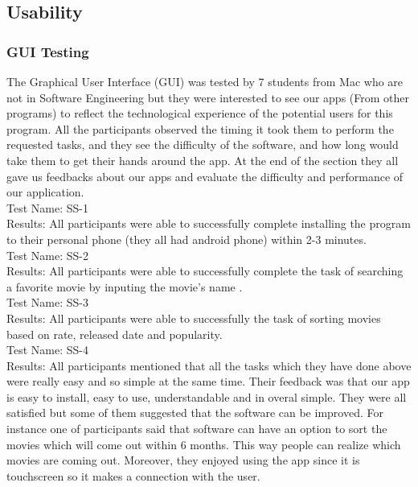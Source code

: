 \documentclass[12pt, titlepage]{article}
\begin{document}
\subsection{Usability}
\subsubsection{GUI Testing}
The Graphical User Interface (GUI) was tested by 7 students from Mac who are not in Software Engineering but they were interested to see our apps (From other programs) to reflect the technological experience of the potential users for this program. All the participants observed the timing it took them to perform the requested tasks, and they see the difficulty of the software, and how long would take them to get their hands around the app. At the end of the section they all gave us feedbacks about our apps and evaluate the difficulty and performance of our application.\\

	
Test Name: SS-1 \\
Results: All participants were able to successfully complete installing the program to their personal phone (they all had android phone) within 2-3 minutes.\\

Test Name: SS-2 \\
Results: All participants were able to successfully complete the task of searching a favorite movie by inputing the movie's name .\\

Test Name: SS-3 \\
Results: All participants were able to successfully the task of sorting movies based on rate, released date and popularity.\\


Test Name: SS-4 \\
Results: All participants mentioned that all the tasks which they have done above were really easy and so simple at the same time. Their feedback was that our app is easy to install, easy to use, understandable and in overal simple. They were all satisfied but some of them suggested that the software can be improved. For instance one of participants said that software can have an option to sort the movies which  will come out within 6 months. This way people can realize which movies are coming out. Moreover, they enjoyed using the app since it is touchscreen so it makes a connection with the user. \\
\end{document}
